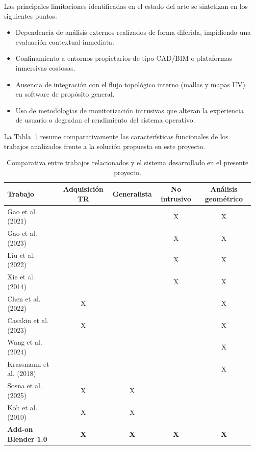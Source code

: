 Las principales limitaciones identificadas en el estado del arte se sintetizan en los siguientes puntos:
\begin{itemize}
    \item Dependencia de análisis externos realizados de forma diferida, impidiendo una evaluación contextual inmediata.
    \item Confinamiento a entornos propietarios de tipo CAD/BIM o plataformas inmersivas costosas.
    \item Ausencia de integración con el flujo topológico interno (mallas y mapas UV) en software de propósito general.
    \item Uso de metodologías de monitorización intrusivas que alteran la experiencia de usuario o degradan el rendimiento del sistema operativo.
\end{itemize}

La Tabla~\ref{tab:comparativa_trabajos} resume comparativamente las características funcionales de los trabajos analizados frente a la solución propuesta en este proyecto.

\begin{table}[H]
\centering
\small
\begin{tabular}{lcccc}
\hline
\textbf{Trabajo} & \textbf{Adquisición TR} & \textbf{Generalista} & \textbf{No intrusivo} & \textbf{Análisis geométrico} \\
\hline
Gao et al. (2021)       &   &   & X & X \\
Gao et al. (2023)       &   &   & X & X \\
Liu et al. (2022)       &   &   & X & X \\
Xie et al. (2014)       &   &   & X & X \\
Chen et al. (2022)      & X &   &   & X \\
Casakin et al. (2023)   & X &   &   & X \\
Wang et al. (2024)      &   &   &   & X \\
Krassmann et al. (2018) &   &   &   & X \\
Sosna et al. (2025)     & X & X &   &   \\
Koh et al. (2010)       & X & X &   &   \\
\textbf{Add-on Blender 1.0} & \textbf{X} & \textbf{X} & \textbf{X} & \textbf{X} \\
\hline
\end{tabular}
\caption{Comparativa entre trabajos relacionados y el sistema desarrollado en el presente proyecto.}
\label{tab:comparativa_trabajos}
\end{table}

